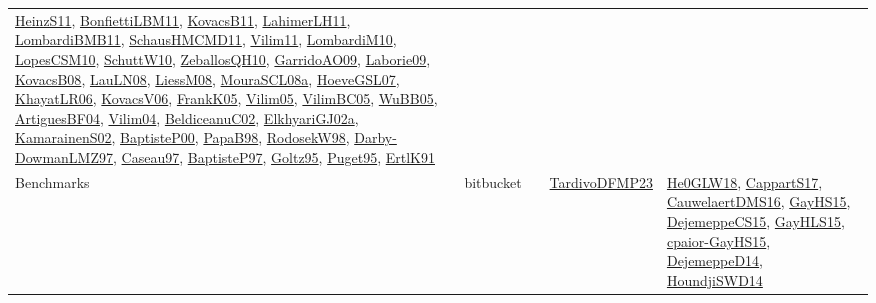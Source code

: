 {\begin{longtable}{lp{3cm}>{\raggedright}p{6cm}>{\raggedright}p{6cm}p{8cm}}
\href{papers/HeinzS11.pdf}{HeinzS11}\cite{HeinzS11}, \href{papers/BonfiettiLBM11.pdf}{BonfiettiLBM11}\cite{BonfiettiLBM11}, \href{articles/KovacsB11.pdf}{KovacsB11}\cite{KovacsB11}, \href{papers/LahimerLH11.pdf}{LahimerLH11}\cite{LahimerLH11}, \href{papers/LombardiBMB11.pdf}{LombardiBMB11}\cite{LombardiBMB11}, \href{articles/SchausHMCMD11.pdf}{SchausHMCMD11}\cite{SchausHMCMD11}, \href{papers/Vilim11.pdf}{Vilim11}\cite{Vilim11}, \href{papers/LombardiM10.pdf}{LombardiM10}\cite{LombardiM10}, \href{articles/LopesCSM10.pdf}{LopesCSM10}\cite{LopesCSM10}, \href{papers/SchuttW10.pdf}{SchuttW10}\cite{SchuttW10}, \href{articles/ZeballosQH10.pdf}{ZeballosQH10}\cite{ZeballosQH10}, \href{articles/GarridoAO09.pdf}{GarridoAO09}\cite{GarridoAO09}, \href{papers/Laborie09.pdf}{Laborie09}\cite{Laborie09}, \href{articles/KovacsB08.pdf}{KovacsB08}\cite{KovacsB08}, \href{papers/LauLN08.pdf}{LauLN08}\cite{LauLN08}, \href{articles/LiessM08.pdf}{LiessM08}\cite{LiessM08}, \href{papers/MouraSCL08a.pdf}{MouraSCL08a}\cite{MouraSCL08a}, \href{papers/HoeveGSL07.pdf}{HoeveGSL07}\cite{HoeveGSL07}, \href{articles/KhayatLR06.pdf}{KhayatLR06}\cite{KhayatLR06}, \href{papers/KovacsV06.pdf}{KovacsV06}\cite{KovacsV06}, \href{papers/FrankK05.pdf}{FrankK05}\cite{FrankK05}, \href{papers/Vilim05.pdf}{Vilim05}\cite{Vilim05}, \href{articles/VilimBC05.pdf}{VilimBC05}\cite{VilimBC05}, \href{papers/WuBB05.pdf}{WuBB05}\cite{WuBB05}, \href{papers/ArtiguesBF04.pdf}{ArtiguesBF04}\cite{ArtiguesBF04}, \href{papers/Vilim04.pdf}{Vilim04}\cite{Vilim04}, \href{papers/BeldiceanuC02.pdf}{BeldiceanuC02}\cite{BeldiceanuC02}, \href{papers/ElkhyariGJ02a.pdf}{ElkhyariGJ02a}\cite{ElkhyariGJ02a}, \href{papers/KamarainenS02.pdf}{KamarainenS02}\cite{KamarainenS02}, \href{articles/BaptisteP00.pdf}{BaptisteP00}\cite{BaptisteP00}, \href{articles/PapaB98.pdf}{PapaB98}\cite{PapaB98}, \href{papers/RodosekW98.pdf}{RodosekW98}\cite{RodosekW98}, \href{articles/Darby-DowmanLMZ97.pdf}{Darby-DowmanLMZ97}\cite{Darby-DowmanLMZ97}, \href{papers/Caseau97.pdf}{Caseau97}\cite{Caseau97}, \href{papers/BaptisteP97.pdf}{BaptisteP97}\cite{BaptisteP97}, \href{papers/Goltz95.pdf}{Goltz95}\cite{Goltz95}, \href{papers/Puget95.pdf}{Puget95}\cite{Puget95}, \href{papers/ErtlK91.pdf}{ErtlK91}\cite{ErtlK91}\\
Benchmarks & bitbucket &  & \href{papers/TardivoDFMP23.pdf}{TardivoDFMP23}\cite{TardivoDFMP23} & \href{papers/He0GLW18.pdf}{He0GLW18}\cite{He0GLW18}, \href{papers/CappartS17.pdf}{CappartS17}\cite{CappartS17}, \href{papers/CauwelaertDMS16.pdf}{CauwelaertDMS16}\cite{CauwelaertDMS16}, \href{papers/GayHS15.pdf}{GayHS15}\cite{GayHS15}, \href{papers/DejemeppeCS15.pdf}{DejemeppeCS15}\cite{DejemeppeCS15}, \href{papers/GayHLS15.pdf}{GayHLS15}\cite{GayHLS15}, \href{papers/cpaior-GayHS15.pdf}{cpaior-GayHS15}\cite{cpaior-GayHS15}, \href{papers/DejemeppeD14.pdf}{DejemeppeD14}\cite{DejemeppeD14}, \href{papers/HoundjiSWD14.pdf}{HoundjiSWD14}\cite{HoundjiSWD14}\\

\end{longtable}}
